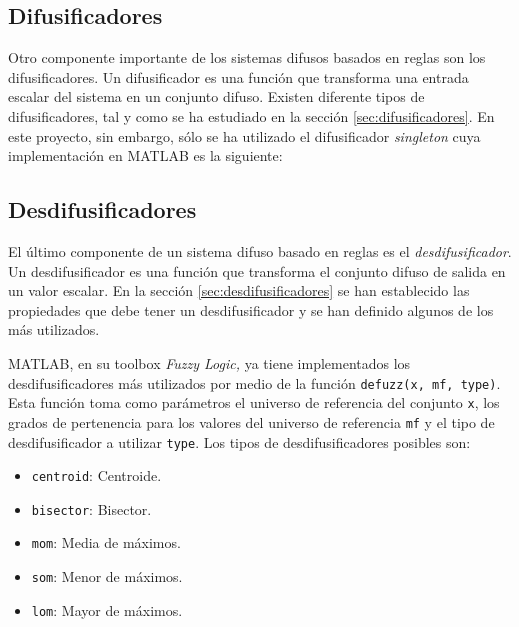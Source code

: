 \subsection{Difusificadores}
Otro componente importante de los sistemas difusos basados en reglas son los difusificadores. Un difusificador es una función que transforma una entrada escalar del sistema en un conjunto difuso. Existen diferente tipos de difusificadores, tal y como se ha estudiado en la sección \ref{sec:difusificadores}. En este proyecto, sin embargo, sólo se ha utilizado el difusificador \emph{singleton} cuya implementación en MATLAB es la siguiente:



\subsection{Desdifusificadores}
El último componente de un sistema difuso basado en reglas es el \emph{desdifusificador}. Un desdifusificador es una función que transforma el conjunto difuso de salida en un valor escalar. En la sección \ref{sec:desdifusificadores} se han establecido las propiedades que debe tener un desdifusificador y se han definido algunos de los más utilizados.

MATLAB, en su toolbox \emph{Fuzzy Logic,} ya tiene implementados los desdifusificadores más utilizados por medio de la función \lstinline|defuzz(x, mf, type)|. Esta función toma como parámetros el universo de referencia del conjunto \lstinline|x|, los grados de pertenencia para los valores del universo de referencia \lstinline|mf| y el tipo de desdifusificador a utilizar \lstinline|type|. Los tipos de desdifusificadores posibles son:

\begin{itemize}
\item \lstinline|centroid|: Centroide.
\item \lstinline|bisector|: Bisector.
\item \lstinline|mom|: Media de máximos.
\item \lstinline|som|: Menor de máximos.
\item \lstinline|lom|: Mayor de máximos.
\end{itemize}


